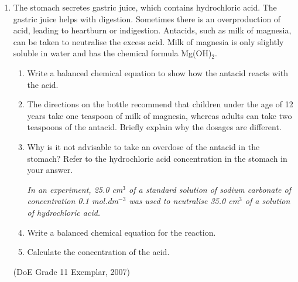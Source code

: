 {\begin{enumerate}
\begin{enumerate}
(IEB Paper 2, 2005)

	\item{
When chlorine water (Cl$_{2}$ dissolved in water) is added to a solution of potassium bromide, bromine is produced. Which one of the following statements concerning this reaction is correct?
		\begin{enumerate}
		\item{Br$^{-}$ is oxidised}
		\item{Cl$_{2}$ is oxidised}
		\item{Br$^{-}$ is the oxidising agent}
		\item{Cl$^{-}$ is the oxidising agent}
		\end{enumerate}
}
(IEB Paper 2, 2005)
	\end{enumerate}
\renewcommand{\labelenumii}{\alph{enumii}}

\item{
The stomach secretes gastric juice, which contains hydrochloric acid. The gastric juice helps with digestion. Sometimes there is an overproduction of acid, leading to heartburn or indigestion. Antacids, such as milk of magnesia, can be taken to neutralise the excess acid. Milk of magnesia is only slightly soluble in water and has the chemical formula Mg(OH)$_{2}$.
	\begin{enumerate}
	\item{Write a balanced chemical equation to show how the antacid reacts with the acid.}
	\item{The directions on the bottle recommend that children under the age of 12 years take one teaspoon of milk of magnesia, whereas adults can take two teaspoons of the antacid. Briefly explain why the dosages are different.}
	\item{Why is it not advisable to take an overdose of the antacid in the stomach? Refer to the hydrochloric acid concentration in the stomach in your answer.}

\textit{In an experiment, 25.0 cm$^{3}$ of a standard solution of sodium carbonate of concentration 0.1 mol.dm$^{-3}$ was used to neutralise 35.0 cm$^{3}$ of a solution of hydrochloric acid.}

	\item{Write a balanced chemical equation for the reaction.}
	\item{Calculate the concentration of the acid.} 
	\end{enumerate}
}
(DoE Grade 11 Exemplar, 2007)
\end{enumerate}
}


